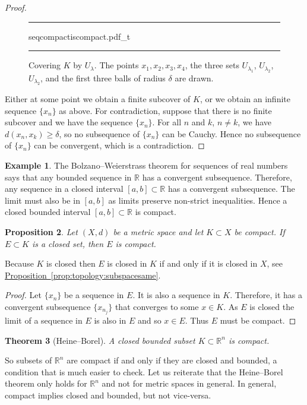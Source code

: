 \documentclass[12pt,openany]{book}
\newcommand{\R}{{\mathbb{R}}}
\theoremstyle{plain}
\newtheorem{thm}{Theorem}[section]
\newtheorem{prop}[thm]{Proposition}
\theoremstyle{remark}
\theoremstyle{definition}
\newenvironment{myfig}{%
\begin{figure}[h!t]
\noindent\rule{\textwidth}{0.4pt}\vspace{12pt}\par\centering}%
{\par\noindent\rule{\textwidth}{0.4pt}
\end{figure}}
\theoremstyle{exercise}
\theoremstyle{example}
\newtheorem{example}[thm]{Example}
\newcommand{\propref}[1]{\hyperref[#1]{Proposition~\ref*{#1}}}
\begin{document}
\begin{proof}
\begin{myfig}
{seqcompactiscompact.pdf_t}
\caption{Covering $K$ by $U_{\lambda}$.  The points
$x_1,x_2,x_3,x_4$, 
the three sets 
$U_{\lambda_1}$,
$U_{\lambda_2}$,
$U_{\lambda_2}$,
and 
the first three balls
of radius $\delta$ are drawn.\label{fig:seqcompactiscompact}}
\end{myfig}

Either at some point we obtain a finite subcover of $K$,
or we obtain an
infinite
sequence $\{ x_n \}$ as above.
For contradiction, suppose that
there is no finite subcover and we have the sequence $\{ x_n \}$.
For all $n$ and $k$, $n \not= k$, 
we have $d(x_n,x_k) \geq \delta$,
so no subsequence of $\{ x_n \}$ can be
Cauchy.  Hence no subsequence of $\{ x_n \}$ can be convergent,
which is a contradiction.
\end{proof}

\begin{example}
The Bolzano--Weierstrass theorem for sequences of real numbers
says that any bounded sequence in $\R$ has a convergent
subsequence.  Therefore, any sequence in a closed interval $[a,b] \subset \R$ has 
a convergent subsequence.  The limit must also be in $[a,b]$ as limits
preserve non-strict inequalities.  Hence a closed bounded interval $[a,b]
\subset \R$ is compact.
\end{example}

\begin{prop}
Let $(X,d)$ be a metric space and let $K \subset X$ be compact.  If
$E \subset K$ is a closed set, then $E$ is compact.
\end{prop}

Because $K$ is closed then $E$ is closed in $K$ if
and only if it is closed in $X$,
see \propref{prop:topology:subspacesame}.

\begin{proof}
Let $\{ x_n \}$ be a sequence in $E$.  It is also a sequence in $K$.
Therefore, it has a convergent subsequence $\{ x_{n_j} \}$ that converges to
some $x \in K$.  As $E$ is closed the limit of a sequence in $E$ is also in $E$
and so $x \in E$.  Thus $E$ must be compact.
\end{proof}

\begin{thm}[Heine--Borel] 
\label{thm:msbw}
A closed bounded subset $K \subset \R^n$ is compact.
\end{thm}

So subsets of $\R^n$ are compact if and only if they are closed and bounded,
a condition that is much easier to check.
Let us reiterate that the Heine--Borel theorem only holds for $\R^n$ and not
for metric spaces in general.  In general, compact implies closed and
bounded, but not vice-versa.
\end{document}

